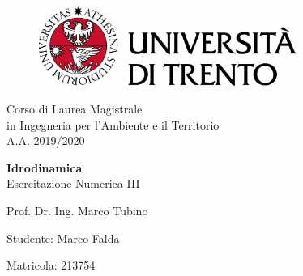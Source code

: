 \documentclass[12pt]{article} %
\begin{document}
{\linespread{2.3}\selectfont
{\sffamily
	\begin{figure}
		\centering
		\includegraphics[width=0.75\textwidth]{logounitrento2019.jpg}
	\end{figure}
		
	\vspace*{-1.5em}
		
	\begin{center}
		{\Large Corso di Laurea Magistrale}\\
		\vspace*{-0.8em}
		{\Large in Ingegneria per l'Ambiente e il Territorio}\\
		\vspace*{0.5em}
		{\Large A.A. 2019/2020}
				
		\vspace*{4em}
		
		{\Huge \textbf{Idrodinamica}}\\{\Large Esercitazione Numerica III}
		
		\vspace*{4em}
		
		{\Large Prof. Dr. Ing. Marco Tubino}
	\end{center}
	
	\vspace*{3.2em}
	
	\begin{center}
	\begin{multicols}{2}
	\begin{flushright}
	{\Large
		Studente: Marco Falda\\
	}
	\end{flushright}
	\begin{flushleft}
	{\Large
		\hspace*{1em}Matricola: 213754\\
	}
	\end{flushleft}
	\end{multicols}
	\end{center}

}
}
\restoregeometry
\end{document}
